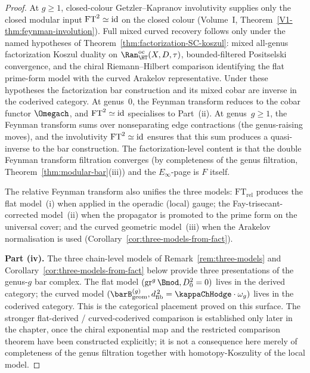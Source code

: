 \begin{proof}
At $g\geq 1$, closed-colour Getzler--Kapranov involutivity supplies
only the closed modular input
$\mathrm{FT}^2\simeq\mathrm{id}$ on the closed colour
(Volume~I, Theorem~\ref*{V1-thm:feynman-involution}). Full mixed
curved recovery follows only under the named hypotheses of
Theorem~\ref{thm:factorization-SC-koszul}: mixed all-genus
factorization Koszul duality on
$\Ran^{\mathrm{oc}}_{\HT}(X,D,\tau)$, bounded-filtered
Positselski convergence, and the chiral Riemann--Hilbert comparison
identifying the flat prime-form model with the curved Arakelov
representative. Under these hypotheses the factorization bar
construction and its mixed cobar are inverse in the coderived
category. At genus~$0$, the
Feynman transform reduces to the cobar functor $\Omegach$,
and $\mathrm{FT}^2 \simeq \mathrm{id}$ specialises to
Part~(ii). At genus~$g \geq 1$, the Feynman transform
sums over nonseparating edge contractions
(the genus-raising moves), and the involutivity
$\mathrm{FT}^2 \simeq \mathrm{id}$ ensures that this sum produces
a quasi-inverse to the bar construction.
The factorization-level content is that the double Feynman
transform filtration converges (by completeness of the genus
filtration, Theorem~\ref{thm:modular-bar}(iii)) and the
$E_\infty$-page is $F$ itself.

The relative Feynman transform also unifies the three models:
$\mathrm{FT}_{\mathrm{rel}}$ produces the flat model~(i) when
applied in the operadic (local) gauge;
the Fay-trisecant-corrected model~(ii) when the propagator is
promoted to the prime form on the universal cover; and the
curved geometric model~(iii) when the Arakelov normalisation
is used (Corollary~\ref{cor:three-models-from-fact}).

\smallskip\noindent
\textbf{Part (iv).} The three chain-level models of
Remark~\ref{rem:three-models} and
Corollary~\ref{cor:three-models-from-fact} below
provide three presentations of the genus-$g$ bar complex.
The flat model $(\mathrm{gr}^g\, \Bmod, D_0^2 = 0)$ lives in the
derived category; the curved model
$(\barB^{(g)}_{\mathrm{geom}}, \dfib^{\,2} = \kappaChHodge \cdot
\omega_g)$ lives in the coderived category. This is the
categorical placement proved on this surface. The stronger
flat-derived / curved-coderived comparison is established only
later in the chapter, once the chiral exponential map and the
restricted comparison theorem have been constructed explicitly;
it is not a consequence here merely of completeness of the genus
filtration together with homotopy-Koszulity of the local model.
\end{proof}

